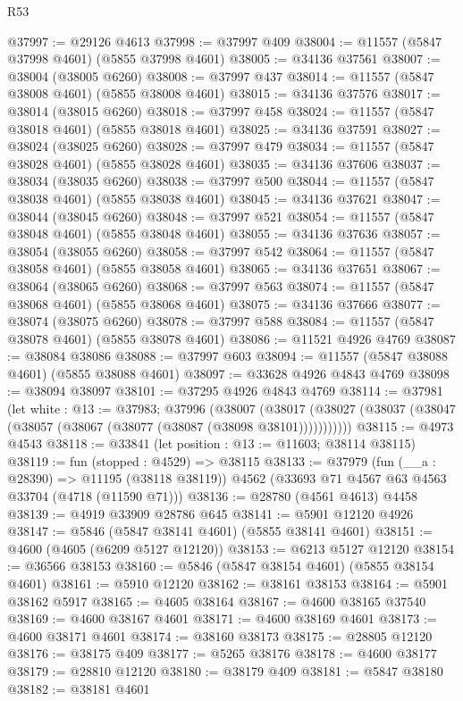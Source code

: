 \begin{lexlean}{R53}
\begin{coremodule}
@37997 := @29126 @4613
@37998 := @37997 @409
@38004 := @11557 (@5847 @37998 @4601) (@5855 @37998 @4601)
@38005 := @34136 @37561
@38007 := @38004 (@38005 @6260)
@38008 := @37997 @437
@38014 := @11557 (@5847 @38008 @4601) (@5855 @38008 @4601)
@38015 := @34136 @37576
@38017 := @38014 (@38015 @6260)
@38018 := @37997 @458
@38024 := @11557 (@5847 @38018 @4601) (@5855 @38018 @4601)
@38025 := @34136 @37591
@38027 := @38024 (@38025 @6260)
@38028 := @37997 @479
@38034 := @11557 (@5847 @38028 @4601) (@5855 @38028 @4601)
@38035 := @34136 @37606
@38037 := @38034 (@38035 @6260)
@38038 := @37997 @500
@38044 := @11557 (@5847 @38038 @4601) (@5855 @38038 @4601)
@38045 := @34136 @37621
@38047 := @38044 (@38045 @6260)
@38048 := @37997 @521
@38054 := @11557 (@5847 @38048 @4601) (@5855 @38048 @4601)
@38055 := @34136 @37636
@38057 := @38054 (@38055 @6260)
@38058 := @37997 @542
@38064 := @11557 (@5847 @38058 @4601) (@5855 @38058 @4601)
@38065 := @34136 @37651
@38067 := @38064 (@38065 @6260)
@38068 := @37997 @563
@38074 := @11557 (@5847 @38068 @4601) (@5855 @38068 @4601)
@38075 := @34136 @37666
@38077 := @38074 (@38075 @6260)
@38078 := @37997 @588
@38084 := @11557 (@5847 @38078 @4601) (@5855 @38078 @4601)
@38086 := @11521 @4926 @4769
@38087 := @38084 @38086
@38088 := @37997 @603
@38094 := @11557 (@5847 @38088 @4601) (@5855 @38088 @4601)
@38097 := @33628 @4926 @4843 @4769
@38098 := @38094 @38097
@38101 := @37295 @4926 @4843 @4769
@38114 := @37981
    (let white : @13 := @37983;
    @37996
      (@38007
        (@38017 (@38027 (@38037 (@38047 (@38057 (@38067 (@38077 (@38087 (@38098 @38101)))))))))))
@38115 := @4973 @4543
@38118 := @33841 (let position : @13 := @11603; @38114 @38115)
@38119 := fun (stopped : @4529) => @38115
@38133 := @37979
    (fun (__a : @28390) => @11195 (@38118 @38119))
    @4562
    (@33693 @71 @4567 @63 @4563 @33704 (@4718 (@11590 @71)))
@38136 := @28780 (@4561 @4613) @4458
@38139 := @4919 @33909 @28786 @645
@38141 := @5901 @12120 @4926
@38147 := @5846 (@5847 @38141 @4601) (@5855 @38141 @4601)
@38151 := @4600 (@4605 (@6209 @5127 @12120))
@38153 := @6213 @5127 @12120
@38154 := @36566 @38153
@38160 := @5846 (@5847 @38154 @4601) (@5855 @38154 @4601)
@38161 := @5910 @12120
@38162 := @38161 @38153
@38164 := @5901 @38162 @5917
@38165 := @4605 @38164
@38167 := @4600 @38165 @37540
@38169 := @4600 @38167 @4601
@38171 := @4600 @38169 @4601
@38173 := @4600 @38171 @4601
@38174 := @38160 @38173
@38175 := @28805 @12120
@38176 := @38175 @409
@38177 := @5265 @38176
@38178 := @4600 @38177
@38179 := @28810 @12120
@38180 := @38179 @409
@38181 := @5847 @38180
@38182 := @38181 @4601

\end{coremodule}
\end{lexlean}
